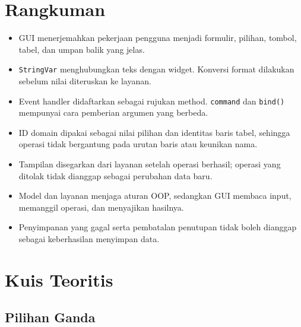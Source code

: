 \section{Rangkuman}

\begin{itemize}
  \item GUI menerjemahkan pekerjaan pengguna menjadi formulir, pilihan, tombol, tabel, dan umpan balik yang jelas.
  \item \texttt{StringVar} menghubungkan teks dengan widget. Konversi format dilakukan sebelum nilai diteruskan ke layanan.
  \item Event handler didaftarkan sebagai rujukan method. \texttt{command} dan \texttt{bind()} mempunyai cara pemberian argumen yang berbeda.
  \item ID domain dipakai sebagai nilai pilihan dan identitas baris tabel, sehingga operasi tidak bergantung pada urutan baris atau keunikan nama.
  \item Tampilan disegarkan dari layanan setelah operasi berhasil; operasi yang ditolak tidak dianggap sebagai perubahan data baru.
  \item Model dan layanan menjaga aturan OOP, sedangkan GUI membaca input, memanggil operasi, dan menyajikan hasilnya.
  \item Penyimpanan yang gagal serta pembatalan penutupan tidak boleh dianggap sebagai keberhasilan menyimpan data.
\end{itemize}

\section{Kuis Teoritis}

\subsection{Pilihan Ganda}

